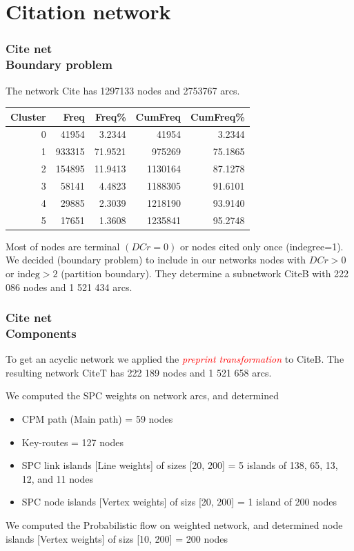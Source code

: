 \documentclass[hyperref={pdfstartview={FitBH -32768},
                         pdfpagemode=FullScreen,
                         plainpages=false,
                         colorlinks=true}
              ]{beamer}
\newcommand{\keyw}[1]{\textcolor{red}{\emph{#1}}}
\newcommand{\indeg}{\mbox{indeg}}
\begin{document}
\section{Citation network}  


\begin{frame}[fragile]
\frametitle{Cite net \\ \normalsize Boundary problem}
\small 

The network Cite has 1297133  nodes and 2753767 arcs.
\medskip

\begin{tabular}{r|r|r|r|r|}
 Cluster &       Freq &    Freq\%  &  CumFreq &  CumFreq\% \\ \hline
 0     & 41954   &  3.2344     & 41954   &  3.2344  \\ 
1   &  933315  &  71.9521   &  975269  & 75.1865  \\
2   &  154895   & 11.9413   & 1130164  &  87.1278 \\
3   &  58141    & 4.4823   & 1188305   & 91.6101  \\ 
4   &  29885   & 2.3039  & 1218190  & 93.9140 \\  
5   &  17651   & 1.3608   & 1235841  & 95.2748  \\ \hline
\end{tabular}

\medskip

Most of nodes are terminal $(DCr=0)$ or nodes cited only once (indegree=1). We decided (boundary problem) to include in our networks nodes with $DCr > 0$ or $\indeg > 2$ (partition boundary). They determine a subnetwork CiteB with  222 086 nodes and 1 521 434 arcs.

\end{frame}

\begin{frame}[fragile]
\frametitle{Cite net \\ \normalsize Components}
\small 
To get an acyclic network we applied the \keyw{preprint transformation} to CiteB. The resulting network CiteT has 222 189 nodes and 1 521 658 arcs. 

We computed the SPC weights on network arcs, and determined 
\begin{itemize}
\item CPM path (Main path) = 59 nodes
\item Key-routes = 127 nodes  
\item SPC link islands [Line weights] of sizes [20, 200] = 5 islands of 138, 65, 13, 12, and 11 nodes  
\item SPC node islands [Vertex weights] of sizs  [20, 200] = 1 island of 200 nodes
\end{itemize}

\medskip 

We computed the Probabilistic flow on weighted network, and determined node islands [Vertex weights] of sizs  [10, 200] = 200 nodes

\end{frame}
\end{document}
